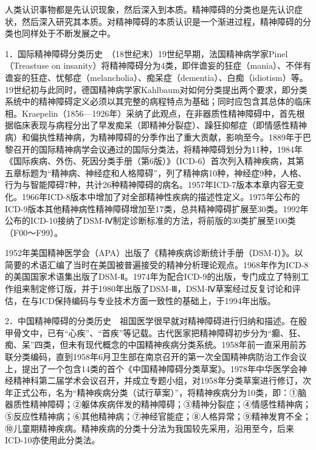 人类认识事物都是先认识现象，然后深入到本质。精神障碍的分类也是先认识症状，然后深入研究其本质。对精神障碍的本质认识是一个渐进过程，精神障碍的分类也同样处于不断发展之中。

1．国际精神障碍分类历史　（18世纪末）19世纪早期，法国精神病学家Pinel（Treastuse
on
insanity）将精神障碍分为4类，即伴谵妄的狂症（mania）、不伴有谵妄的狂症、忧郁症（melancholia）、痴呆症（dementia）、白痴（idiotism）等。19世纪初与此同时，德国精神病学家Kahlbaum对如何分类提出两个要求，即分类系统中的精神障碍定义必须以其完整的病程特点为基础；同时应包含其总体的临床相。Kraepelin（1856---1926年）采纳了此观点，在非器质性精神障碍中，首先根据临床表现与病程分出了早发痴呆（即精神分裂症）、躁狂抑郁症（即情感性精神病）和偏执性精神病，为精神障碍的分季作出了重大贡献，影响至今。1889年于巴黎召开的国际精神病学会议通过的国际分类法，将精神障碍划分为11种，1984年《国际疾病、外伤、死因分类手册（第6版）》（ICD-6）首次列入精神疾病，其第五章标题为``精神病、神经症和人格障碍''，列了精神病10种，神经症9种，人格、行为与智能障碍7种，共计26种精神障碍的病名。1957年ICD-7版本本章内容无变化。1966年ICD-8版本中增加了对全部精神性疾病的描述性定义。1975年公布的ICD-9版本其他精神病性精神障碍增加至17类，总共精神障碍扩展至30类。1992年公布的ICD-10接纳了DSM-Ⅳ制定诊断标准的方法，将前版的30类扩展至100类（F00～F99）。

1952年美国精神医学会（APA）出版了《精神疾病诊断统计手册（DSM-I）》。以简要的术语汇编了当时在美国被普遍接受的精神分析理论观点。1968年作为ICD-8的美国国家术语集出版了DSM-Ⅱ。1974年为配合ICD-9的出版，专门成立了特别工作组来制定修订版，并于1980年出版了DSM-Ⅲ，DSM-Ⅳ草案经过反复讨论和评估，在与ICD保持编码与专业技术方面一致性的基础上，于1994年出版。

2．中国精神障碍的分类历史　祖国医学很早就对精神障碍进行归纳和描述。在殷甲骨文中，已有``心疾''、``首疾''等记载。古代医家把精神障碍初步分为``癫、狂、痴、呆''四类，但未有现代概念的中国精神疾病分类系统。1958年前一直采用前苏联分类编码，直到1958年6月卫生部在南京召开的第一次全国精神病防治工作会议上，提出了一个包含14类的首个《中国精神障碍分类草案》。1978年中华医学会神经精神科第二届学术会议召开，并成立专题小组，对1958年分类草案进行修订，次年正式公布，名为``精神疾病分类（试行草案）''，将精神疾病分为10类，即：①脑器质性精神障碍；②躯体疾病伴发的精神障碍；③精神分裂症；④情感性精神病；⑤反应性精神病；⑥其他精神病；⑦神经官能症；⑧人格异常；⑨精神发育不全；⑩儿童期精神疾病。精神疾病的分类十分法为我国较先采用，沿用至今，后来ICD-10亦使用此分类法。

